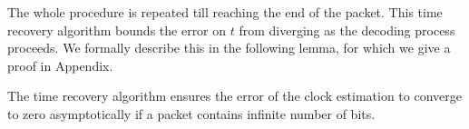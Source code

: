 The whole procedure is repeated till reaching the end of the packet. This time recovery algorithm bounds the error on $t$ from diverging as the decoding process proceeds. %
We formally describe this in the following lemma, for which we give a proof in Appendix.
\begin{lemma}
The time recovery algorithm ensures the error of the \vitag clock estimation to converge to zero asymptotically if a packet contains infinite number of bits. 
\label{lem:lemma1}
\end{lemma}







%
%

